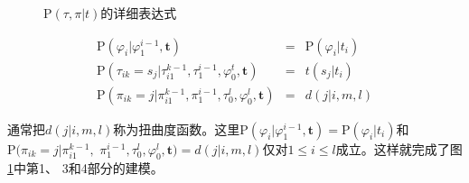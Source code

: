 \begin{figure}[htp]
    \centering

   \caption{{$\textrm{P}(\tau,\pi|t)$}的详细表达式}
\setlength{\belowcaptionskip}{-0.5em}
   \label{fig:3-31}
\end{figure}

\vspace{-3.0em}
\begin{eqnarray}
\textrm{P}(\varphi_i|\varphi_1^{i-1},\mathbf{t})                                                              & = &{\textrm{P}(\varphi_i|t_i)} \label{eq:3-67} \\
\textrm{P}(\tau_{ik} = s_j |\tau_{i1}^{k-1},\tau_{1}^{i-1},\varphi_0^t,\mathbf{t})             & = & t(s_j|t_i) \label{eq:3-68} \\
\textrm{P}(\pi_{ik} = j |\pi_{i1}^{k-1},\pi_{1}^{i-1},\tau_{0}^{l},\varphi_{0}^{l},\mathbf{t}) & = & d(j|i,m,l) \label{eq:3-69}
\label{eq:3-49}
\end{eqnarray}

\parinterval 通常把$d(j|i,m,l)$称为扭曲度函数。这里$\textrm{P}(\varphi_i|\varphi_1^{i-1},\mathbf{t})={\textrm{P}(\varphi_i|t_i)}$和${\textrm{P}(\pi_{ik}=j|\pi_{i1}^{k-1},}$ $\pi_{1}^{i-1},\tau_0^l,\varphi_0^l,\mathbf{t})=d(j|i,m,l)$仅对$1 \le i \le l$成立。这样就完成了图\ref{fig:3-31}中第1、 3和4部分的建模。


